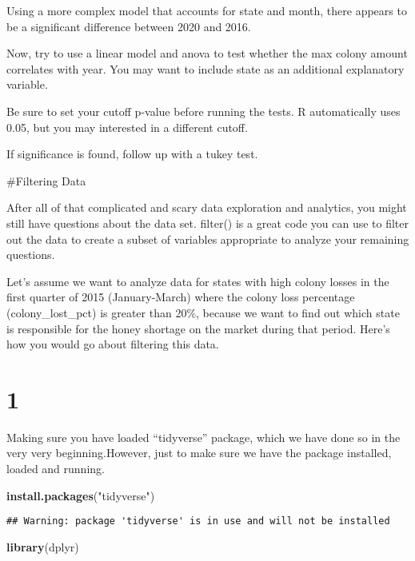 \documentclass[
]{article}
\newenvironment{Shaded}{\begin{snugshade}}{\end{snugshade}}
\newcommand{\FunctionTok}[1]{\textcolor[rgb]{0.13,0.29,0.53}{\textbf{#1}}}
\newcommand{\NormalTok}[1]{#1}
\newcommand{\StringTok}[1]{\textcolor[rgb]{0.31,0.60,0.02}{#1}}
\begin{document}
Using a more complex model that accounts for state and month, there
appears to be a significant difference between 2020 and 2016.

Now, try to use a linear model and anova to test whether the max colony
amount correlates with year. You may want to include state as an
additional explanatory variable.

Be sure to set your cutoff p-value before running the tests. R
automatically uses 0.05, but you may interested in a different cutoff.

If significance is found, follow up with a tukey test.

\#Filtering Data

After all of that complicated and scary data exploration and analytics,
you might still have questions about the data set. filter() is a great
code you can use to filter out the data to create a subset of variables
appropriate to analyze your remaining questions.

Let's assume we want to analyze data for states with high colony losses
in the first quarter of 2015 (January-March) where the colony loss
percentage (colony\_lost\_pct) is greater than 20\%, because we want to
find out which state is responsible for the honey shortage on the market
during that period. Here's how you would go about filtering this data.

\section{1}\label{section}

Making sure you have loaded ``tidyverse'' package, which we have done so
in the very very beginning.However, just to make sure we have the
package installed, loaded and running.

\begin{Shaded}
\begin{Highlighting}[]
\FunctionTok{install.packages}\NormalTok{(}\StringTok{"tidyverse"}\NormalTok{)}
\end{Highlighting}
\end{Shaded}

\begin{verbatim}
## Warning: package 'tidyverse' is in use and will not be installed
\end{verbatim}

\begin{Shaded}
\begin{Highlighting}[]
\FunctionTok{library}\NormalTok{(dplyr)}
\end{Highlighting}
\end{Shaded}
\end{document}
